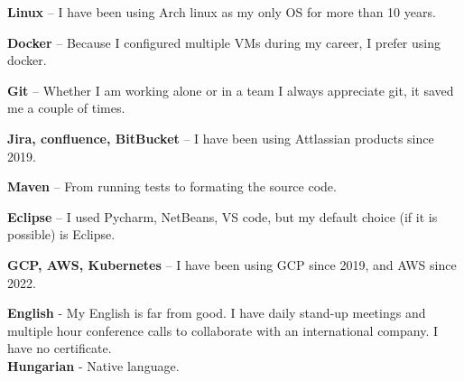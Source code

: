 \documentclass[9pt]{developercv} %
\begin{document}

\begin{minipage}[t]{0.49\textwidth}
    \vspace{-\baselineskip} %


    \textbf{Linux}
    -- I have been using Arch linux as my only OS for more than 10 years.

    \textbf{Docker} 
    -- Because I configured multiple VMs during my career, I prefer using docker.

    \textbf{Git}
    -- Whether I am working alone or in a team I always appreciate git, it saved me a couple of times.

    \textbf{Jira, confluence, BitBucket}
    -- I have been using Attlassian products since 2019.

    \textbf{Maven}
    -- From running tests to formating the source code.

    \textbf{Eclipse}
    -- I used Pycharm, NetBeans, VS code, but my default choice (if it is possible) is Eclipse.

    \textbf{GCP, AWS, Kubernetes}
    -- I have been using GCP since 2019, and AWS since 2022.


    \textbf{English}
     - My English is far from good. I have daily stand-up meetings and multiple hour conference calls to collaborate with an international company. I have no certificate.\\
    \textbf{Hungarian}
     - Native language.

\end{minipage}
\hfill
\end{document}
